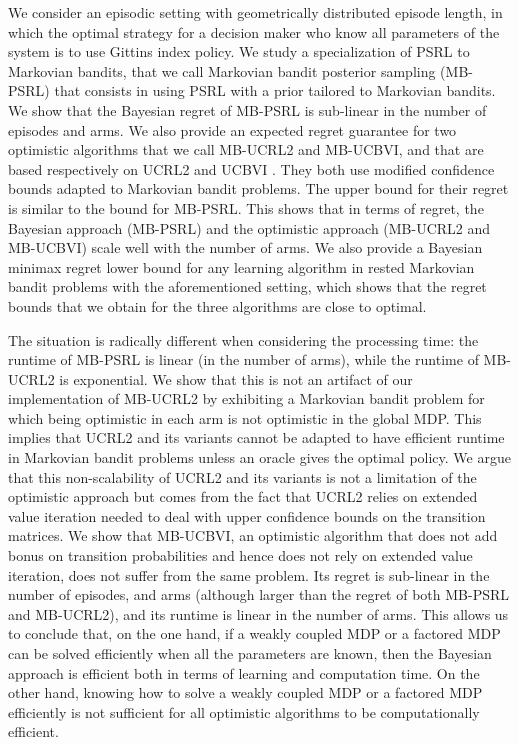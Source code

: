 We consider an episodic setting with geometrically distributed episode length, in which the optimal strategy for a decision maker who know all parameters of the system is to use Gittins index policy. We study a specialization of PSRL \cite{osband2013more} to Markovian bandits, that we call Markovian bandit posterior sampling (MB-PSRL) that consists in using PSRL with a prior tailored to Markovian bandits. We show that the Bayesian regret of MB-PSRL is sub-linear in the number of episodes and arms. We also provide an expected regret guarantee for two optimistic algorithms that we call MB-UCRL2 and MB-UCBVI, and that are based respectively on UCRL2 \cite{jaksch2010near} and UCBVI \cite{azar2017minimax}. They both use modified  confidence bounds adapted to Markovian bandit problems. The upper bound for their regret is similar to the bound for MB-PSRL. This shows that in terms of regret, the Bayesian approach (MB-PSRL) and the optimistic approach (MB-UCRL2 and MB-UCBVI) scale well with the number of arms. We also provide a Bayesian minimax regret lower bound for any learning algorithm in rested Markovian bandit problems with the aforementioned setting, which shows that the regret bounds that we obtain for the three algorithms are close to optimal.

The situation is radically different when considering the processing time: the runtime of MB-PSRL is linear (in the number of arms), while the runtime of MB-UCRL2 is exponential. We show that this is not an artifact of our implementation of MB-UCRL2 by exhibiting a Markovian bandit problem for which being optimistic in each arm is not optimistic in the global MDP. This implies that UCRL2 and its variants \cite{bourel2020tightening,fruit2018efficient,talebi2018variance,filippi2010optimism} cannot be adapted to have efficient runtime in Markovian bandit problems unless an oracle gives the optimal policy. We argue that this non-scalability of UCRL2 and its variants is not a limitation  of the optimistic approach but comes from the fact that UCRL2 relies on  extended value iteration \cite{jaksch2010near} needed to deal with  upper confidence bounds on the transition matrices.  We show that MB-UCBVI, an optimistic algorithm that does not add bonus on transition probabilities and hence does not rely on extended value iteration,  does not suffer from the same problem. Its  regret is  sub-linear in the number of episodes, and arms (although larger than the regret of both MB-PSRL and MB-UCRL2), and its  runtime is linear in the number of arms.
This allows us to conclude that, on the one hand, if a weakly coupled MDP or a factored MDP can be solved efficiently when all the parameters are known, then the Bayesian approach is efficient both in terms of learning and computation time. On the other hand, knowing how to solve a weakly coupled MDP or a factored MDP efficiently is not sufficient for all optimistic algorithms to be computationally efficient.

